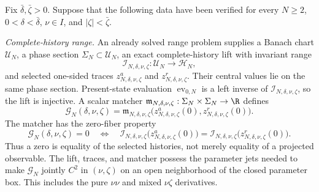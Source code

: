\begin{theorem}
\label{thm:abstract-root-response}
Fix \(\bar\delta,\bar\zeta>0\).  Suppose that the following data have been
verified for every \(N\ge2\), \(0<\delta<\bar\delta\), \(\nu\in I\), and
\(|\zeta|<\bar\zeta\).

\smallskip
\noindent
\emph{Complete-history range.}
An already solved range problem supplies a Banach chart \(\mathcal U_N\),
a phase section \(\Sigma_N\subset\mathcal U_N\), an exact
complete-history lift with invariant range
\[
 \mathcal I_{N,\delta,\nu,\zeta}:\mathcal U_N\longrightarrow\mathcal H_N,
\]
and selected one-sided traces
\(z^a_{N,\delta,\nu,\zeta}\) and
\(z^r_{N,\delta,\nu,\zeta}\).  Their central values lie on the same phase
section.  Present-state evaluation \(\operatorname{ev}_{0,N}\) is a left
inverse of \(\mathcal I_{N,\delta,\nu,\zeta}\), so the lift is injective.
A scalar matcher
\(\mathfrak m_{N,\delta,\nu,\zeta}:\Sigma_N\times\Sigma_N\to\R\)
defines
\begin{equation}
 \mathscr G_N(\delta,\nu,\zeta)
 =\mathfrak m_{N,\delta,\nu,\zeta}
   \bigl(z^a_{N,\delta,\nu,\zeta}(0),
         z^r_{N,\delta,\nu,\zeta}(0)\bigr).
 \label{eq:abstract-gap-definition}
\end{equation}
The matcher has the zero-fiber property
\begin{equation}
 \mathscr G_N(\delta,\nu,\zeta)=0
 \quad\Longleftrightarrow\quad
 \mathcal I_{N,\delta,\nu,\zeta}
       \bigl(z^a_{N,\delta,\nu,\zeta}(0)\bigr)
 =\mathcal I_{N,\delta,\nu,\zeta}
       \bigl(z^r_{N,\delta,\nu,\zeta}(0)\bigr).
 \label{eq:abstract-zero-fiber}
\end{equation}
Thus a zero is equality of the selected histories, not merely equality of a
projected observable.  The lift, traces, and matcher possess the parameter
jets needed to make \(\mathscr G_N\) jointly \(C^2\) in \((\nu,\zeta)\) on
an open neighborhood of the closed parameter box.  This includes the pure
\(\nu\nu\) and mixed \(\nu\zeta\) derivatives.


\end{theorem}
